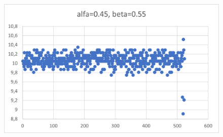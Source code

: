 \documentclass[12pt]{mwart}
\begin{document}
	\begin{figure}[H]
		\centering
		\includegraphics{10_a0.45.png}
	\end{figure}
\end{document}
